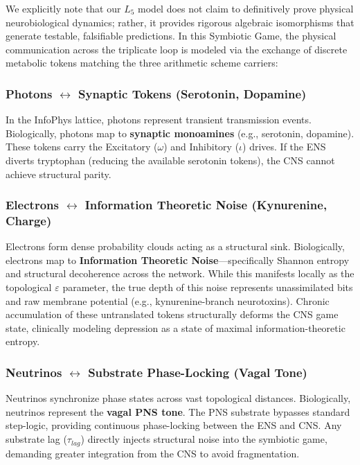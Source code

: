 \begin{hypothesis}
We explicitly note that our $L_5$ model does not claim to definitively prove physical neurobiological dynamics; rather, it provides rigorous algebraic isomorphisms that generate testable, falsifiable predictions. In this Symbiotic Game, the physical communication across the triplicate loop is modeled via the exchange of discrete metabolic tokens matching the three arithmetic scheme carriers:

\subsubsection*{Photons \texorpdfstring{$\leftrightarrow$}{\textleftrightarrow} Synaptic Tokens (Serotonin, Dopamine)}
In the InfoPhys lattice, photons represent transient transmission events. Biologically, photons map to \textbf{synaptic monoamines} (e.g., serotonin, dopamine). These tokens carry the Excitatory ($\omega$) and Inhibitory ($\iota$) drives. If the ENS diverts tryptophan (reducing the available serotonin tokens), the CNS cannot achieve structural parity.

\subsubsection*{Electrons \texorpdfstring{$\leftrightarrow$}{\textleftrightarrow} Information Theoretic Noise (Kynurenine, Charge)}
Electrons form dense probability clouds acting as a structural sink. Biologically, electrons map to \textbf{Information Theoretic Noise}---specifically Shannon entropy and structural decoherence across the network. While this manifests locally as the topological $\varepsilon$ parameter, the true depth of this noise represents unassimilated bits and raw membrane potential (e.g., kynurenine-branch neurotoxins). Chronic accumulation of these untranslated tokens structurally deforms the CNS game state, clinically modeling depression as a state of maximal information-theoretic entropy.

\subsubsection*{Neutrinos \texorpdfstring{$\leftrightarrow$}{\textleftrightarrow} Substrate Phase-Locking (Vagal Tone)}
Neutrinos synchronize phase states across vast topological distances. Biologically, neutrinos represent the \textbf{vagal PNS tone}. The PNS substrate bypasses standard step-logic, providing continuous phase-locking between the ENS and CNS. Any substrate lag ($\tau_{lag}$) directly injects structural noise into the symbiotic game, demanding greater integration from the CNS to avoid fragmentation.


\end{hypothesis}
